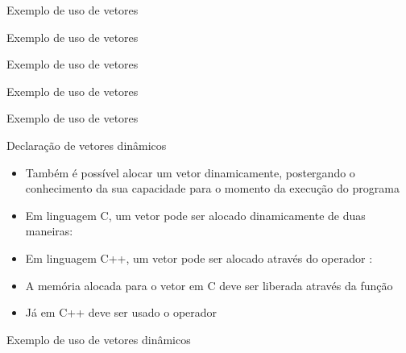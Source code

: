 \begin{frame}[fragile]{Exemplo de uso de vetores}
\end{frame}

\begin{frame}[fragile]{Exemplo de uso de vetores}
\end{frame}

\begin{frame}[fragile]{Exemplo de uso de vetores}
\end{frame}

\begin{frame}[fragile]{Exemplo de uso de vetores}
\end{frame}

\begin{frame}[fragile]{Exemplo de uso de vetores}
\end{frame}

\begin{frame}[fragile]{Declaração de vetores dinâmicos}

	\begin{itemize}
		\item Também é possível alocar um vetor dinamicamente, 
        postergando o conhecimento da sua capacidade para o momento da execução do programa

		\item Em linguagem C, um vetor pode ser alocado dinamicamente 
		de {duas} maneiras:

		\item Em linguagem C++, um vetor pode ser alocado através do 
		operador :

		\item A memória alocada para o vetor em C deve ser liberada através da função 

		\item Já em C++ deve ser usado o operador 
		
	\end{itemize}

\end{frame}

\begin{frame}[fragile]{Exemplo de uso de vetores dinâmicos}
\end{frame}


